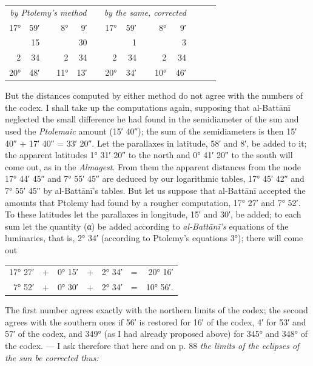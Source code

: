 \documentclass[11pt]{article}
\newcommand{\Pg}[1]{\marginpar{\footnotesize\color{gray}#1}}
\begin{document}
\begin{center}\small\begin{tabular}{rrcrrcrrcrrcrr}
\multicolumn{5}{c}{\emph{by Ptolemy's method}} &  & \multicolumn{5}{c}{\emph{by the same, corrected}} \\
17° & 59′ &  & 8° & 9′ &  & 17° & 59′ &  & 8° & 9′ \\
 & 15 &  &  & 30 &  &  & 1 &  &  & 3 \\
2 & 34 &  & 2 & 34 &  & 2 & 34 &  & 2 & 34 \\
\midrule
20° & 48′ &  & 11° & 13′ &  & 20° & 34′ &  & 10° & 46′ \\
\end{tabular}\end{center}
\par But the distances computed by either method do not agree with the numbers of the codex. I shall take up the computations again, supposing that al-Battānī neglected the small difference he had found in the semidiameter of the sun and used the \emph{Ptolemaic} amount (15′ 40″); the sum of the semidiameters is then 15′ 40″ + 17′ 40″ = 33′ 20″. Let the parallaxes in latitude, 58′ and 8′, be added to it; the apparent latitudes 1° 31′ 20″ to the north and 0° 41′ 20″ to the south will come out, as in the \emph{Almagest}. From them the apparent distances from the node 17° 44′ 45″ and 7° 55′ 45″ are deduced by our logarithmic tables, 17° 45′ 42″ and 7° 55′ 45″ by al-Battānī's tables. But let us suppose that al-Battānī accepted the amounts that Ptolemy had found by a rougher computation, 17° 27′ and 7° 52′. To these latitudes let the parallaxes in longitude, 15′ and 30′, be added; to each sum let the quantity ({\greekfont α}) be added according to \emph{al-Battānī's} equations of the luminaries, that is, 2° 34′ (according to Ptolemy's equations 3°); there will come out\par
\begin{center}\small\begin{tabular}{rcrcrcr}
17° 27′ & + & 0° 15′ & + & 2° 34′ & = & 20° 16′ \\
7° 52′ & + & 0° 30′ & + & 2° 34′ & = & 10° 56′. \\
\end{tabular}\end{center}
\par \Pg{II 209}The first number agrees exactly with the northern limits of the codex; the second agrees with the southern ones if  56′ is restored for  16′ of the codex,  4′ for  53′ and  57′ of the codex, and  349° (as I had already proposed above) for  345° and  348° of the codex. — I ask therefore that here and on p. 88 \emph{the limits of the eclipses of the sun be corrected thus:}\par
\end{document}
